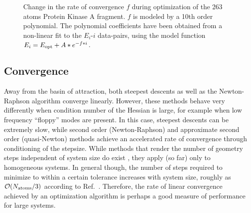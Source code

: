\documentclass[prl,twocolumn,showpacs,twocolumngrid,superbib]{revtex4}
\begin{document}
{\begin{figure}[h]
\caption{
Change in the rate of convergence $f$ during  optimization
of the 263 atoms Protein Kinase A fragment. $f$ is modeled
by a 10th order polynomial. The polynomial coefficients
have been obtained from a non-linear fit to the $E_{i}$-$i$
data-pairs, using the model function $E_{i}=E_{\rm opt}+A*e^{-f*i}$.}
\label{convfact} 
\end{figure}
}

\subsection{Convergence}

Away from the basin of attraction, both steepest descents as well as the 
Newton-Raphson algorithm converge linearly.   However, these methods behave very differently
when condition number of the Hessian is large, for example when low frequency ``floppy'' modes
are present.  In this case, steepest descents can be extremely slow, while second order 
(Newton-Raphson) and approximate second order (quasi-Newton) methods achieve an accelerated rate 
of convergence through conditioning of the stepsize.   While methods that render  the
number of geometry steps independent of system size do exist \cite{SGoedecker01}, they apply (so far) 
only to homogeneous systems.  In general though, the number of steps required to minimize to within
a certain tolerance increases with system size, roughly as ${\cal O}(N_{\rm atoms}/3)$ 
according to Ref.~.  Therefore, the rate of linear convergence achieved by an 
optimization algorithm is perhaps a good  measure of performance for large systems.  
\end{document}
